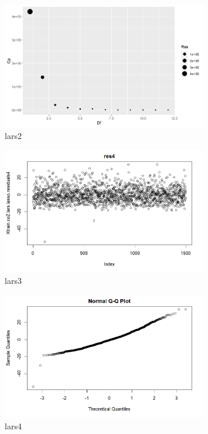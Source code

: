 \documentclass{article}
\begin{document}
\begin{figure}[h!]
        \centering
        \includegraphics[width=0.8\textwidth]{../plots/lars2.png}
        \caption{lars2}
        \label{fig:lars2}
\end{figure}

\begin{figure}[h!]
        \centering
        \includegraphics[width=0.8\textwidth]{../plots/lars3.png}
        \caption{lars3}
        \label{fig:lars3}
\end{figure}

\begin{figure}[h!]
        \centering
        \includegraphics[width=0.8\textwidth]{../plots/lars4.png}
        \caption{lars4}
        \label{fig:lars4}
\end{figure}
\end{document}
